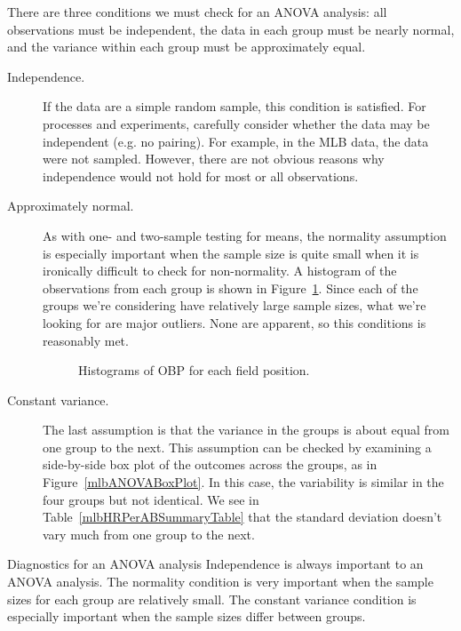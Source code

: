 There are three conditions we must check for an ANOVA analysis:
all observations must be independent,
the data in each group must be nearly normal,
and the variance within each group must be approximately equal.
\begin{description}
\item[Independence.]
    If the data are a simple random sample,
    this condition is satisfied.
    For processes and experiments, carefully consider whether
    the data may be independent (e.g. no pairing).
    For example, in the MLB data, the data were not sampled.
    However, there are not obvious reasons why independence
    would not hold for most or all observations.
\item[Approximately normal.]
    As with one- and two-sample testing for means,
    the normality assumption is especially important
    when the sample size is quite small when it is
    ironically difficult to check for non-normality.
    A histogram of the observations from each group
    is shown in Figure~\ref{mlbANOVADiagNormalityGroups}.
    Since each of the groups we're considering have
    relatively large sample sizes,
    what we're looking for are major outliers.
    None are apparent, so this conditions is reasonably met.
    \begin{figure}[h]
      \centering
      \caption{Histograms of OBP for each field position.}
      \label{mlbANOVADiagNormalityGroups}
    \end{figure}
\item[Constant variance.]
    The last assumption is that the variance in the
    groups is about equal from one group to the next.
    This assumption can be checked by examining a
    side-by-side box plot of the outcomes across the
    groups, as in Figure~\vref{mlbANOVABoxPlot}.
    In this case, the variability is similar in the
    four groups but not identical.
    We see in Table~\vref{mlbHRPerABSummaryTable}
    that the standard deviation doesn't vary much
    from one group to the next.
\end{description}


\begin{onebox}{Diagnostics for an ANOVA analysis}
  Independence is always important to an ANOVA analysis.
  The normality condition is very important when the sample
  sizes for each group are relatively small.
  The constant variance condition is especially important
  when the sample sizes differ between groups.
\end{onebox}


